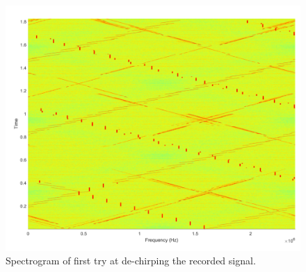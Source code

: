 \documentclass{icmmcm}
\begin{document}
\begin{figure}[h]
  \begin{center}
    \includegraphics[width=12 cm]{Figures/2}
  \end{center}
  \caption{Spectrogram of first try at de-chirping the recorded signal.}
  \label{fig:Fig2}
\end{figure}
\end{document}
